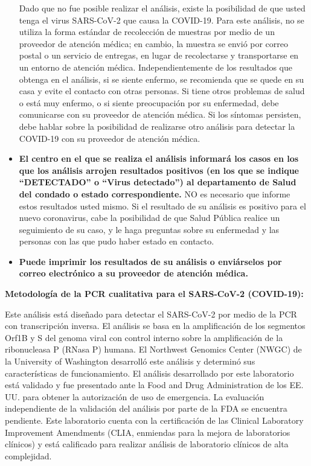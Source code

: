 \documentclass[10pt]{article}
\begin{document}
\begin{itemize}
Dado que no fue posible realizar el análisis, existe la posibilidad de que usted
 tenga el virus SARS-CoV-2 que causa la COVID-19. Para este análisis, no se
 utiliza la forma estándar de recolección de muestras por medio de un proveedor
 de atención médica; en cambio, la muestra se envió por correo postal o un
 servicio de entregas, en lugar de recolectarse y transportarse en un entorno de
 atención médica. Independientemente de los resultados que obtenga en el
 análisis, si se siente enfermo, se recomienda que se quede en su casa y evite
 el contacto con otras personas. Si tiene otros problemas de salud o está muy
 enfermo, o si siente preocupación por su enfermedad, debe comunicarse con su
 proveedor de atención médica. Si los síntomas persisten, debe hablar sobre la
 posibilidad de realizarse otro análisis para detectar la COVID-19 con su
 proveedor de atención médica.


\item

  \textbf{El centro en el que se realiza el análisis informará los casos en los
  que los análisis arrojen resultados positivos (en los que se indique
  ``DETECTADO'' o ``Virus detectado'') al departamento de Salud del condado o
  estado correspondiente.} NO es necesario que informe estos resultados usted
  mismo. Si el resultado de su análisis es positivo para el nuevo coronavirus,
  cabe la posibilidad de que Salud Pública realice un seguimiento de su caso, y
  le haga preguntas sobre su enfermedad y las personas con las que pudo haber
  estado en contacto.

\item

  \textbf{Puede imprimir los resultados de su análisis o enviárselos por correo
  electrónico a su proveedor de atención médica.}

\end{itemize}

\bigskip
\textbf{Metodología de la PCR cualitativa para el SARS-CoV-2 (COVID-19):}

Este análisis está diseñado para detectar el SARS-CoV-2 por medio de la PCR con
transcripción inversa. El análisis se basa en la amplificación de los segmentos
Orf1B y S del genoma viral con control interno sobre la amplificación de la
ribonucleasa P (RNasa P) humana. El Northwest Genomics Center (NWGC) de la
University of Washington desarrolló este análisis y determinó sus
características de funcionamiento. El análisis desarrollado por este laboratorio
está validado y fue presentado ante la Food and Drug Administration de los EE. 
UU. para obtener la autorización de uso de emergencia. La evaluación
independiente de la validación del análisis por parte de la FDA se encuentra
pendiente. Este laboratorio cuenta con la certificación de las Clinical
Laboratory Improvement Amendments (CLIA, enmiendas para la mejora de
laboratorios clínicos) y está calificado para realizar análisis de laboratorio
clínicos de alta complejidad.
\end{document}
